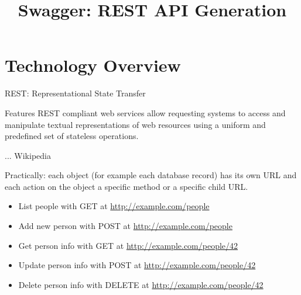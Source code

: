 \RequirePackage{slides-shared}
\title{Swagger: REST API Generation}



\makepreamble


\section{Technology Overview}




\begin{frame}{REST: Representational State Transfer}
    \begin{block}{Features}
        REST compliant web services allow requesting systems to access
        and manipulate textual representations of web resources using
        a uniform and predefined set of stateless operations.

        \hfill ... Wikipedia
    \end{block}

    \bigskip

    Practically: each object (for example each database record) has its own URL
    and each action on the object a specific method or a specific child URL.

    \medskip

    \begin{itemize}
        \item List people with GET at \url{http://example.com/people}
        \item Add new person with POST at \url{http://example.com/people}
        \item Get person info with GET at \url{http://example.com/people/42}
        \item Update person info with POST at \url{http://example.com/people/42}
        \item Delete person info with DELETE at \url{http://example.com/people/42}
    \end{itemize}

\end{frame}


